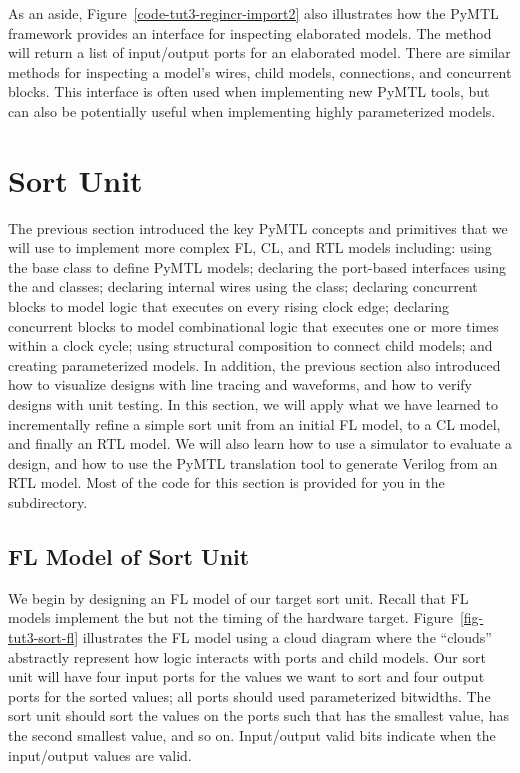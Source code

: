 \documentclass{cbxdoc}
\begin{document}
As an aside, Figure~\ref{code-tut3-regincr-import2} also illustrates how
the PyMTL framework provides an interface for inspecting elaborated
models. The  method will return a list of input/output
ports for an elaborated model. There are similar methods for inspecting a
model's wires, child models, connections, and concurrent blocks. This
interface is often used when implementing new PyMTL tools, but can also
be potentially useful when implementing highly parameterized models.


\section{Sort Unit}
\label{sec-sort}

The previous section introduced the key PyMTL concepts and primitives
that we will use to implement more complex FL, CL, and RTL models
including: using the  base class to define PyMTL models;
declaring the port-based interfaces using the  and
 classes; declaring internal wires using the  class;
declaring  concurrent blocks to model logic that executes on
every rising clock edge; declaring  concurrent blocks
to model combinational logic that executes one or more times within a
clock cycle; using structural composition to connect child models; and
creating parameterized models. In addition, the previous section also
introduced how to visualize designs with line tracing and waveforms, and
how to verify designs with unit testing. In this section, we will apply
what we have learned to incrementally refine a simple sort unit from an
initial FL model, to a CL model, and finally an RTL model. We will also
learn how to use a simulator to evaluate a design, and how to use the
PyMTL translation tool to generate Verilog from an RTL model. Most of the
code for this section is provided for you in the 
subdirectory.

\subsection{FL Model of Sort Unit}




We begin by designing an FL model of our target sort unit. Recall that FL
models implement the  but not the timing of the
hardware target. Figure~\ref{fig-tut3-sort-fl} illustrates the FL model
using a cloud diagram where the ``clouds'' abstractly represent how logic
interacts with ports and child models. Our sort unit will have four input
ports for the values we want to sort and four output ports for the sorted
values; all ports should used parameterized bitwidths. The sort unit
should sort the values on the  ports such that  has
the smallest value,  has the second smallest value, and so on.
Input/output valid bits indicate when the input/output values are valid.
\end{document}
